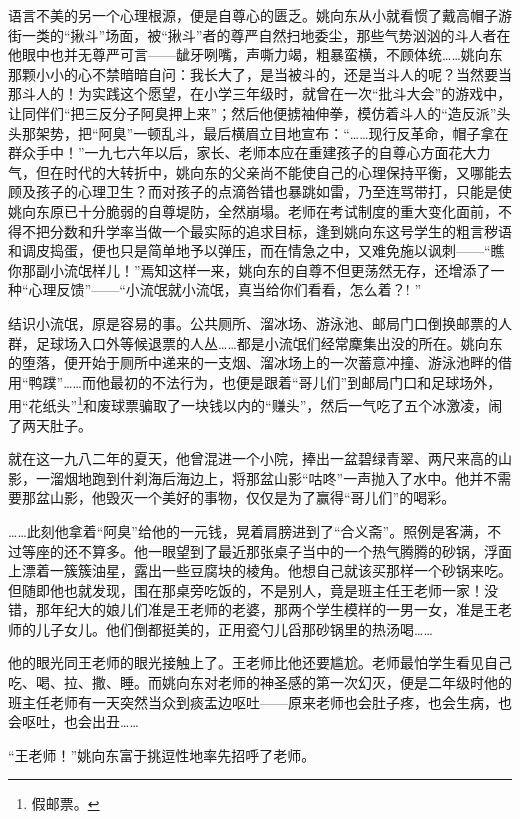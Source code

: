 \par 语言不美的另一个心理根源，便是自尊心的匮乏。姚向东从小就看惯了戴高帽子游街一类的“揪斗”场面，被“揪斗”者的尊严自然扫地委尘，那些气势汹汹的斗人者在他眼中也并无尊严可言——龇牙咧嘴，声嘶力竭，粗暴蛮横，不顾体统……姚向东那颗小小的心不禁暗暗自问：我长大了，是当被斗的，还是当斗人的呢？当然要当那斗人的！为实践这个愿望，在小学三年级时，就曾在一次“批斗大会”的游戏中，让同伴们“把三反分子阿臭押上来”；然后他便掳袖伸拳，模仿着斗人的“造反派”头头那架势，把“阿臭”一顿乱斗，最后横眉立目地宣布：“……现行反革命，帽子拿在群众手中！”一九七六年以后，家长、老师本应在重建孩子的自尊心方面花大力气，但在时代的大转折中，姚向东的父亲尚不能使自己的心理保持平衡，又哪能去顾及孩子的心理卫生？而对孩子的点滴咎错也暴跳如雷，乃至连骂带打，只能是使姚向东原已十分脆弱的自尊堤防，全然崩塌。老师在考试制度的重大变化面前，不得不把分数和升学率当做一个最实际的追求目标，逢到姚向东这号学生的粗言秽语和调皮捣蛋，便也只是简单地予以弹压，而在情急之中，又难免施以讽刺——“瞧你那副小流氓样儿！”焉知这样一来，姚向东的自尊不但更荡然无存，还增添了一种“心理反馈”——“小流氓就小流氓，真当给你们看看，怎么着？! ”
\par 结识小流氓，原是容易的事。公共厕所、溜冰场、游泳池、邮局门口倒换邮票的人群，足球场入口外等候退票的人丛……都是小流氓们经常麇集出没的所在。姚向东的堕落，便开始于厕所中递来的一支烟、溜冰场上的一次蓄意冲撞、游泳池畔的借用“鸭蹼”……而他最初的不法行为，也便是跟着“哥儿们”到邮局门口和足球场外，用“花纸头”\footnote{假邮票。}和废球票骗取了一块钱以内的“赚头”，然后一气吃了五个冰激凌，闹了两天肚子。
\par 就在这一九八二年的夏天，他曾混进一个小院，捧出一盆碧绿青翠、两尺来高的山影，一溜烟地跑到什刹海后海边上，将那盆山影“咕咚”一声抛入了水中。他并不需要那盆山影，他毁灭一个美好的事物，仅仅是为了赢得“哥儿们”的喝彩。
\par ……此刻他拿着“阿臭”给他的一元钱，晃着肩膀进到了“合义斋”。照例是客满，不过等座的还不算多。他一眼望到了最近那张桌子当中的一个热气腾腾的砂锅，浮面上漂着一簇簇油星，露出一些豆腐块的棱角。他想自己就该买那样一个砂锅来吃。但随即他也就发现，围在那桌旁吃饭的，不是别人，竟是班主任王老师一家！没错，那年纪大的娘儿们准是王老师的老婆，那两个学生模样的一男一女，准是王老师的儿子女儿。他们倒都挺美的，正用瓷勺儿舀那砂锅里的热汤喝……
\par 他的眼光同王老师的眼光接触上了。王老师比他还要尴尬。老师最怕学生看见自己吃、喝、拉、撒、睡。而姚向东对老师的神圣感的第一次幻灭，便是二年级时他的班主任老师有一天突然当众到痰盂边呕吐——原来老师也会肚子疼，也会生病，也会呕吐，也会出丑……
\par “王老师！”姚向东富于挑逗性地率先招呼了老师。
